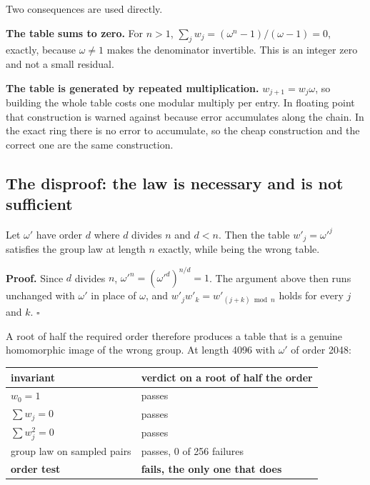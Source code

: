Two consequences are used directly.

\textbf{The table sums to zero.} For \(n > 1\), \(\sum_j w_j = (\omega^n - 1)/(\omega - 1) = 0\), exactly, because \(\omega \ne 1\) makes the denominator invertible. This is an integer zero and not a small residual.

\textbf{The table is generated by repeated multiplication.} \(w_{j+1} = w_j \omega\), so building the whole table costs one modular multiply per entry. In floating point that construction is warned against because error accumulates along the chain. In the exact ring there is no error to accumulate, so the cheap construction and the correct one are the same construction.

\subsection{The disproof: the law is necessary and is not sufficient}

\begin{proposition}
Let \(\omega'\) have order \(d\) where \(d\) divides \(n\) and \(d < n\). Then the table \(w'_j = \omega'^j\) satisfies the group law at length \(n\) exactly, while being the wrong table.
\end{proposition}

\textbf{Proof.} Since \(d\) divides \(n\), \(\omega'^n = (\omega'^d)^{n/d} = 1\). The argument above then runs unchanged with \(\omega'\) in place of \(\omega\), and \(w'_j w'_k = w'_{(j+k) \bmod n}\) holds for every \(j\) and \(k\). \(\square\)

A root of half the required order therefore produces a table that is a genuine homomorphic image of the wrong group. At length 4096 with \(\omega'\) of order 2048:

\begin{center}
\begin{tabular}{@{}ll@{}}
\toprule
invariant & verdict on a root of half the order \\
\midrule
\(w_0 = 1\) & passes \\
\(\sum w_j = 0\) & passes \\
\(\sum w_j^2 = 0\) & passes \\
group law on sampled pairs & passes, 0 of 256 failures \\
\textbf{order test} & \textbf{fails, the only one that does} \\
\bottomrule
\end{tabular}
\end{center}


